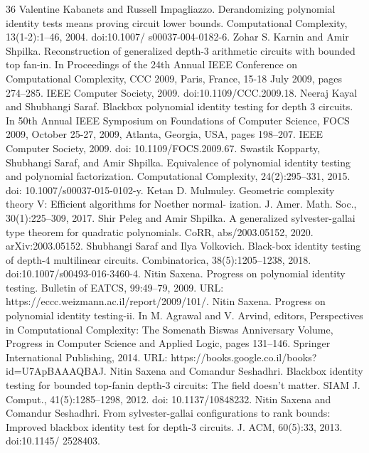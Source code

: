 \begin{thebibliography}{36}
Valentine Kabanets and Russell Impagliazzo. Derandomizing polynomial identity tests means proving circuit lower bounds. Computational Complexity, 13(1-2):1–46, 2004. doi:10.1007/ s00037-004-0182-6.
Zohar S. Karnin and Amir Shpilka. Reconstruction of generalized depth-3 arithmetic circuits with bounded top fan-in. In Proceedings of the 24th Annual IEEE Conference on Computational Complexity, CCC 2009, Paris, France, 15-18 July 2009, pages 274–285. IEEE Computer Society, 2009. doi:10.1109/CCC.2009.18.
Neeraj Kayal and Shubhangi Saraf. Blackbox polynomial identity testing for depth 3 circuits. In 50th Annual IEEE Symposium on Foundations of Computer Science, FOCS 2009, October 25-27, 2009, Atlanta, Georgia, USA, pages 198–207. IEEE Computer Society, 2009. doi: 10.1109/FOCS.2009.67.
Swastik Kopparty, Shubhangi Saraf, and Amir Shpilka. Equivalence of polynomial identity testing and polynomial factorization. Computational Complexity, 24(2):295–331, 2015. doi: 10.1007/s00037-015-0102-y.
Ketan D. Mulmuley. Geometric complexity theory V: Efficient algorithms for Noether normal- ization. J. Amer. Math. Soc., 30(1):225–309, 2017.
Shir Peleg and Amir Shpilka. A generalized sylvester-gallai type theorem for quadratic polynomials. CoRR, abs/2003.05152, 2020. arXiv:2003.05152.
Shubhangi Saraf and Ilya Volkovich. Black-box identity testing of depth-4 multilinear circuits. Combinatorica, 38(5):1205–1238, 2018. doi:10.1007/s00493-016-3460-4.
Nitin Saxena. Progress on polynomial identity testing. Bulletin of EATCS, 99:49–79, 2009. URL: https://eccc.weizmann.ac.il/report/2009/101/.
Nitin Saxena. Progress on polynomial identity testing-ii. In M. Agrawal and V. Arvind, editors, Perspectives in Computational Complexity: The Somenath Biswas Anniversary Volume, Progress in Computer Science and Applied Logic, pages 131–146. Springer International Publishing, 2014. URL: https://books.google.co.il/books?id=U7ApBAAAQBAJ.
Nitin Saxena and Comandur Seshadhri. Blackbox identity testing for bounded top-fanin depth-3 circuits: The field doesn’t matter. SIAM J. Comput., 41(5):1285–1298, 2012. doi: 10.1137/10848232.
Nitin Saxena and Comandur Seshadhri. From sylvester-gallai configurations to rank bounds: Improved blackbox identity test for depth-3 circuits. J. ACM, 60(5):33, 2013. doi:10.1145/ 2528403.

\end{thebibliography}
